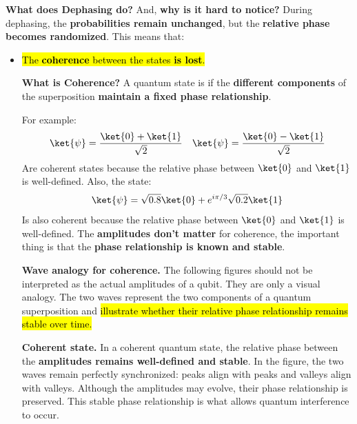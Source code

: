 \highspace
\textcolor{Green3}{ \textbf{What does Dephasing do?}} And, \textcolor{Red2}{ \textbf{why is it hard to notice?}} During dephasing, the \textbf{probabilities remain unchanged}, but the \textbf{relative phase becomes randomized}. This means that:
\begin{itemize}
    \item \hl{The \textbf{coherence} between the states \textbf{is lost}.}\label{def:coherence}

    \textcolor{Green3}{ \textbf{What is Coherence?}} A quantum state is  if the \textbf{different components} of the superposition \textbf{maintain a fixed phase relationship}.

    For example:
    \begin{equation*}
        \ket{\psi} = \frac{\ket{0} + \ket{1}}{\sqrt{2}} \quad \ket{\psi} = \frac{\ket{0} - \ket{1}}{\sqrt{2}}
    \end{equation*}
    Are coherent states because the relative phase between $\ket{0}$ and $\ket{1}$ is well-defined. Also, the state:
    \begin{equation*}
        \ket{\psi} = \sqrt{0.8}\ket{0} + e^{i\pi/3}\sqrt{0.2}\ket{1}
    \end{equation*}
    Is also coherent because the relative phase between $\ket{0}$ and $\ket{1}$ is well-defined. The \textbf{amplitudes don't matter} for coherence, the important thing is that the \textbf{phase relationship is known and stable}.

    \textcolor{Green3}{ \textbf{Wave analogy for coherence.}} The following figures should not be interpreted as the actual amplitudes of a qubit. They are only a visual analogy. The two waves represent the two components of a quantum superposition and \hl{illustrate whether their relative phase relationship remains stable over time.}

    \textcolor{Green3}{ \textbf{Coherent state.}} In a coherent quantum state, the relative phase between the \textbf{amplitudes remains well-defined and stable}. In the figure, the two waves remain perfectly synchronized: peaks align with peaks and valleys align with valleys. Although the amplitudes may evolve, their phase relationship is preserved. This stable phase relationship is what allows quantum interference to occur.
    \begin{center}
\end{center}
\end{itemize}
